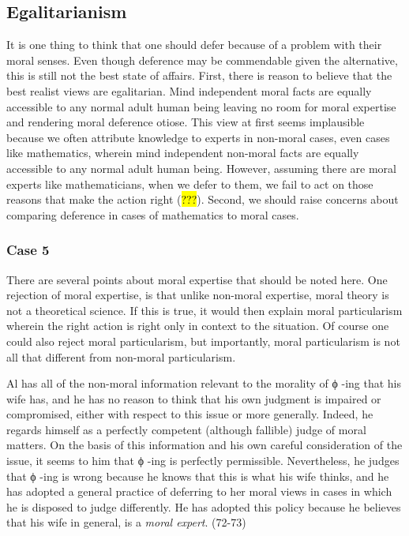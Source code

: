 \documentclass[
  letterpaper,
  DIV=11,
  numbers=noendperiod]{scrartcl}
\theoremstyle{remark}
\begin{document}
\subsection{Egalitarianism}\label{egalitarianism}

It is one thing to think that one should defer because of a problem with
their moral senses. Even though deference may be commendable given the
alternative, this is still not the best state of affairs. First, there
is reason to believe that the best realist views are egalitarian. Mind
independent moral facts are equally accessible to any normal adult human
being leaving no room for moral expertise and rendering moral deference
otiose. This view at first seems implausible because we often attribute
knowledge to experts in non-moral cases, even cases like mathematics,
wherein mind independent non-moral facts are equally accessible to any
normal adult human being. However, assuming there are moral experts like
mathematicians, when we defer to them, we fail to act on those reasons
that make the action right (\hl{???}). Second, we should raise concerns
about comparing deference in cases of mathematics to moral cases.

\subsubsection{Case 5}\label{case-5}

There are several points about moral expertise that should be noted
here. One rejection of moral expertise, is that unlike non-moral
expertise, moral theory is not a theoretical science. If this is true,
it would then explain moral particularism wherein the right action is
right only in context to the situation. Of course one could also reject
moral particularism, but importantly, moral particularism is not all
that different from non-moral particularism.

Al has all of the non-moral information relevant to the morality of ϕ
-ing that his wife has, and he has no reason to think that his own
judgment is impaired or compromised, either with respect to this issue
or more generally. Indeed, he regards himself as a perfectly competent
(although fallible) judge of moral matters. On the basis of this
information and his own careful consideration of the issue, it seems to
him that ϕ -ing is perfectly permissible. Nevertheless, he judges that ϕ
-ing is wrong because he knows that this is what his wife thinks, and he
has adopted a general practice of deferring to her moral views in cases
in which he is disposed to judge differently. He has adopted this policy
because he believes that his wife in general, is a \emph{moral expert}.
(72-73)
\end{document}
